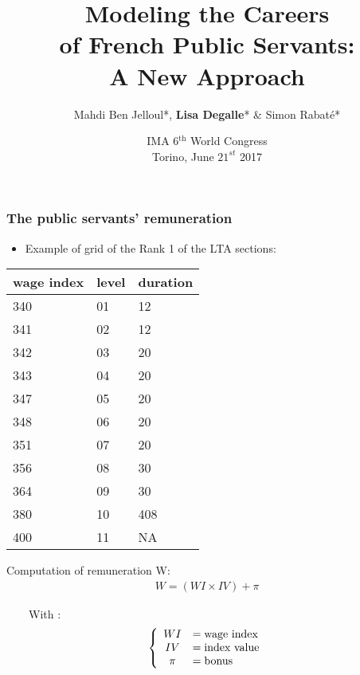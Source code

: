 \documentclass[xcolor=table,ignorenonframetext,12pt]{beamer}
\title{Modeling the Careers \\ of French Public Servants: \\ A New Approach}
\author{ Mahdi Ben Jelloul*, \textbf{Lisa Degalle}* \& Simon Rabaté*}
\institute{
  \inst{*} Institut des politiques publiques
}
\date{IMA 6$^{\text{th}}$ World Congress\\
	Torino, June $21^{st}$ 2017}
\begin{document}
\frame{\maketitle}



\begin{frame}
\frametitle{The public servants' remuneration}

\begin{itemize}
	\item Example of grid of the Rank 1 of the LTA sections:
\end{itemize}

\begin{minipage}{0.5\textwidth}
	\vspace{-0.1cm}
\begin{tabular}{lll}
	\toprule
	{}   wage index & level & duration  \\
	\midrule
  340 &      01 &        12 \\
  341 &      02 &        12 \\
  342 &      03 &        20  \\
  343 &      04 &        20  \\
  347 &      05 &        20 \\
  348 &      06 &        20 \\
  351 &      07 &        20  \\  
  356 &      08 &        30  \\
  364 &      09 &        30  \\
 380 &      10 &        408 \\
  400 &      11 &       NA \\
	\bottomrule
\end{tabular}
\end{minipage}%
\begin{minipage}[l]{0.5\textwidth}
\small
Computation of remuneration W: 
\begin{equation*}
\begin{array}{c}
W =  (WI \times IV) + \pi
\end{array} 
\end{equation*}

~~~~With :
\vspace{-0.1cm}
\begin{equation*}
\left\{\begin{array}{c  l}
WI   &= \text{wage index}  \\
IV   &= \text{index value}   \\
\pi   &= \text{bonus}   \\
\end{array} \right.  
\end{equation*}
\normalsize
\end{minipage}

\end{frame}
\end{document}
